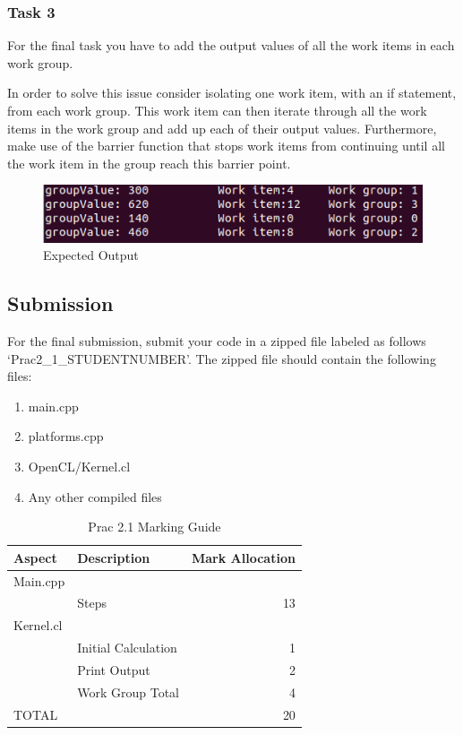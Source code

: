 \subsubsection{Task 3}
For the final task you have to add the output values of all the work items in each work group. 

In order to solve this issue consider isolating one work item, with an if statement, from each work group. This work item can then iterate through all the work items in the work group and add up each of their output values. Furthermore, make use of the barrier function that stops work items from continuing until all the work item in the group reach this barrier point. 

\begin{figure}[H]
\centering
\includegraphics[width=0.9\columnwidth]{Figures/groupValues.png}
\caption{Expected Output}
\label{fig:Expected 2}
\end{figure}

\subsection{Submission}
For the final submission, submit your code in a zipped file labeled as follows `Prac2\_1\_STUDENTNUMBER'. The zipped file should contain the following files:
\begin{enumerate}
    \item main.cpp
    \item platforms.cpp
    \item OpenCL/Kernel.cl
    \item Any other compiled files
\end{enumerate}

\begin{table}[H]
\centering
\caption{Prac 2.1 Marking Guide}
\label{tbl:Prac2Marks}
\begin{tabular}{|l|l|r|}
\hline
\textbf{Aspect} & \textbf{Description} & \multicolumn{1}{l|}{\textbf{Mark Allocation}} \\ \hline
Main.cpp & &  \\ \hline
 & Steps & 13 \\ \hline
Kernel.cl & &  \\ \hline
 & Initial Calculation & 1 \\ \hline
 & Print Output & 2 \\ \hline
 & Work Group Total & 4 \\ \hline
TOTAL &  & 20 \\ \hline
\end{tabular}
\end{table}



